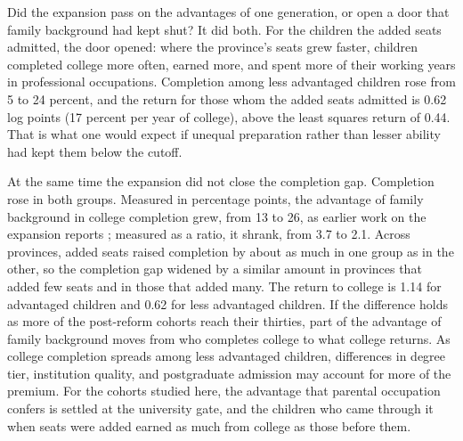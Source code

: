 \documentclass[11pt]{article}
\begin{document}
Did the expansion pass on the advantages of one generation, or open a door that family background had kept shut? It did both. For the children the added seats admitted, the door opened: where the province's seats grew faster, children completed college more often, earned more, and spent more of their working years in professional occupations. Completion among less advantaged children rose from 5 to 24 percent, and the return for those whom the added seats admitted is 0.62 log points (17 percent per year of college), above the least squares return of 0.44. That is what one would expect if unequal preparation rather than lesser ability had kept them below the cutoff.

At the same time the expansion did not close the completion gap. Completion rose in both groups. Measured in percentage points, the advantage of family background in college completion grew, from 13 to 26, as earlier work on the expansion reports \citep{Yeung2013}; measured as a ratio, it shrank, from 3.7 to 2.1. Across provinces, added seats raised completion by about as much in one group as in the other, so the completion gap widened by a similar amount in provinces that added few seats and in those that added many. The return to college is 1.14 for advantaged children and 0.62 for less advantaged children. If the difference holds as more of the post-reform cohorts reach their thirties, part of the advantage of family background moves from who completes college to what college returns. As college completion spreads among less advantaged children, differences in
degree tier, institution quality, and postgraduate admission may
account for more of the premium. For the cohorts studied here, the advantage that parental occupation confers is settled at the university gate, and the children who came through it when seats were added earned as much from college as those before them.

{\footnotesize
\setlength{\bibsep}{1pt}
}
\end{document}
